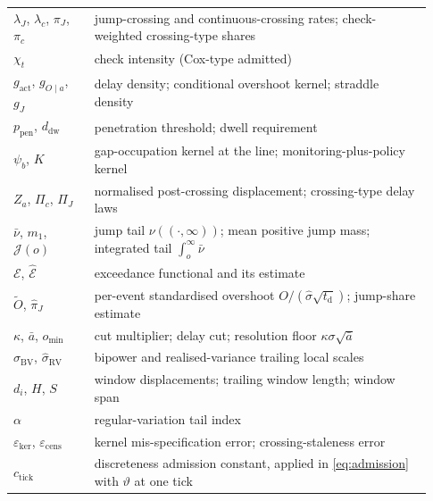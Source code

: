 \documentclass[11pt,a4paper]{article}
\theoremstyle{definition}
\theoremstyle{plain}
\theoremstyle{remark}
\newcommand{\jtail}{\mathcal{J}}
\newcommand{\tact}{t_{\mathrm{d}}}
\begin{document}
\begin{longtable}{@{}>{\centering\arraybackslash}p{0.18\linewidth}p{0.75\linewidth}@{}}
$\lambda_J$, $\lambda_c$, $\pi_J$, $\pi_c$ &
jump-crossing and continuous-crossing rates; check-weighted
crossing-type shares \\
$\chi_t$ & check intensity (Cox-type admitted) \\
$g_{\mathrm{act}}$, $g_{O \mid a}$, $g_J$ & delay density;
conditional overshoot kernel; straddle density \\
$p_{\mathrm{pen}}$, $d_{\mathrm{dw}}$ & penetration threshold; dwell
requirement \\
$\psi_b$, $K$ & gap-occupation kernel at the line;
monitoring-plus-policy kernel \\
$Z_a$, $\Pi_c$, $\Pi_J$ & normalised post-crossing displacement;
crossing-type delay laws \\
$\bar\nu$, $m_1$, $\jtail(o)$ & jump tail $\nu((\cdot, \infty))$;
mean positive jump mass; integrated tail $\int_o^\infty \bar\nu$ \\
$\mathcal{E}$, $\hat{\mathcal{E}}$ & exceedance functional and
its estimate \\
$\tilde O$, $\hat\pi_J$ & per-event standardised overshoot
$O/(\hat\sigma\sqrt{\tact})$; jump-share estimate \\
$\kappa$, $\bar a$, $o_{\min}$ & cut multiplier; delay cut;
resolution floor $\kappa\sigma\sqrt{\bar a}$ \\
$\hat\sigma_{\mathrm{BV}}$, $\hat\sigma_{\mathrm{RV}}$ & bipower
and realised-variance trailing local scales \\
$d_i$, $H$, $S$ & window displacements; trailing window length;
window span \\
$\alpha$ & regular-variation tail index \\
$\varepsilon_{\mathrm{ker}}$, $\varepsilon_{\mathrm{cens}}$ & kernel
mis-specification error; crossing-staleness error \\
$c_{\mathrm{tick}}$ & discreteness admission constant, applied in
\eqref{eq:admission} with $\vartheta$ at one tick \\
\bottomrule
\end{longtable}
\endgroup
\end{document}
